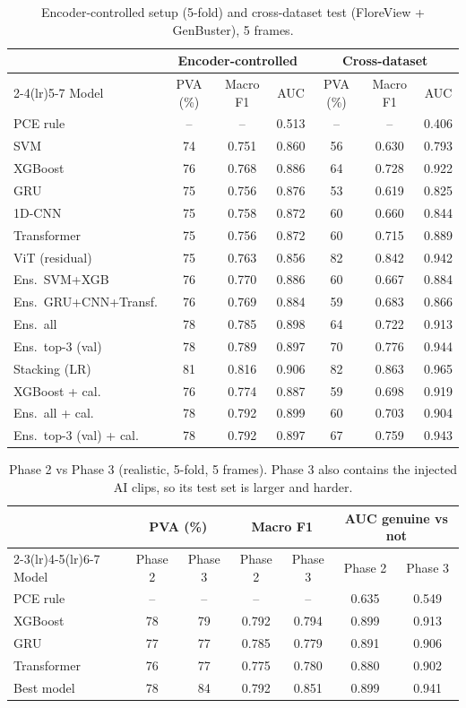 \documentclass[11pt,a4paper]{article}
\begin{document}
\begin{table}[H]\centering\small\caption{Encoder-controlled setup (5-fold) and cross-dataset test (FloreView + GenBuster), 5 frames.}\begin{tabular}{lcccccc}\toprule & \multicolumn{3}{c}{Encoder-controlled} & \multicolumn{3}{c}{Cross-dataset} \\\cmidrule(lr){2-4}\cmidrule(lr){5-7} Model & PVA (\%) & Macro F1 & AUC & PVA (\%) & Macro F1 & AUC \\\midrule
PCE rule & -- & -- & 0.513 & -- & -- & 0.406 \\
SVM & 74 & 0.751 & 0.860 & 56 & 0.630 & 0.793 \\
XGBoost & 76 & 0.768 & 0.886 & 64 & 0.728 & 0.922 \\
GRU & 75 & 0.756 & 0.876 & 53 & 0.619 & 0.825 \\
1D-CNN & 75 & 0.758 & 0.872 & 60 & 0.660 & 0.844 \\
Transformer & 75 & 0.756 & 0.872 & 60 & 0.715 & 0.889 \\
ViT (residual) & 75 & 0.763 & 0.856 & 82 & 0.842 & 0.942 \\
\midrule Ens.\ SVM+XGB & 76 & 0.770 & 0.886 & 60 & 0.667 & 0.884 \\
Ens.\ GRU+CNN+Transf. & 76 & 0.769 & 0.884 & 59 & 0.683 & 0.866 \\
Ens.\ all & 78 & 0.785 & 0.898 & 64 & 0.722 & 0.913 \\
Ens.\ top-3 (val) & 78 & 0.789 & 0.897 & 70 & 0.776 & 0.944 \\
Stacking (LR) & 81 & 0.816 & 0.906 & 82 & 0.863 & 0.965 \\
XGBoost + cal. & 76 & 0.774 & 0.887 & 59 & 0.698 & 0.919 \\
Ens.\ all + cal. & 78 & 0.792 & 0.899 & 60 & 0.703 & 0.904 \\
Ens.\ top-3 (val) + cal. & 78 & 0.792 & 0.897 & 67 & 0.759 & 0.943 \\
\bottomrule\end{tabular}\end{table}
\begin{table}[H]\centering\small\caption{Phase 2 vs Phase 3 (realistic, 5-fold, 5 frames). Phase 3 also contains the injected AI clips, so its test set is larger and harder.}\begin{tabular}{lcccccc}\toprule & \multicolumn{2}{c}{PVA (\%)} & \multicolumn{2}{c}{Macro F1} & \multicolumn{2}{c}{AUC genuine vs not} \\\cmidrule(lr){2-3}\cmidrule(lr){4-5}\cmidrule(lr){6-7} Model & Phase 2 & Phase 3 & Phase 2 & Phase 3 & Phase 2 & Phase 3 \\\midrule
PCE rule & -- & -- & -- & -- & 0.635 & 0.549 \\
XGBoost & 78 & 79 & 0.792 & 0.794 & 0.899 & 0.913 \\
GRU & 77 & 77 & 0.785 & 0.779 & 0.891 & 0.906 \\
Transformer & 76 & 77 & 0.775 & 0.780 & 0.880 & 0.902 \\
\midrule Best model & 78 & 84 & 0.792 & 0.851 & 0.899 & 0.941 \\
\bottomrule\end{tabular}\end{table}
\end{document}
